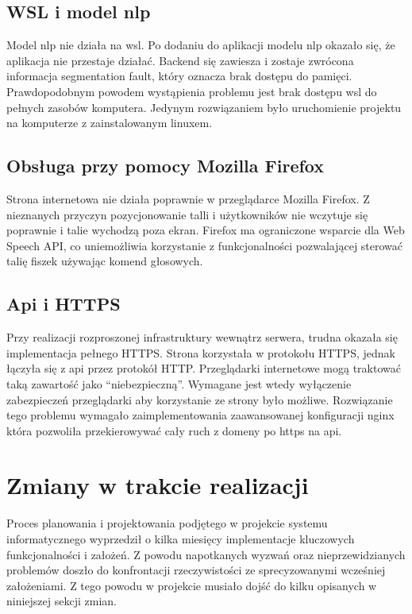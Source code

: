 \subsection{WSL i model nlp}
Model nlp nie działa na wsl. Po dodaniu do aplikacji modelu nlp okazało się, że aplikacja nie przestaje działać. Backend się zawiesza i zostaje zwrócona informacja segmentation fault, który oznacza brak dostępu do pamięci. Prawdopodobnym powodem wystąpienia problemu jest brak dostępu wsl do pełnych zasobów komputera. Jedynym rozwiązaniem było uruchomienie projektu na komputerze z zainstalowanym linuxem.

\subsection{Obsługa przy pomocy Mozilla Firefox}
Strona internetowa nie działa poprawnie w przeglądarce Mozilla Firefox. Z nieznanych przyczyn pozycjonowanie talli i użytkowników nie wczytuje się poprawnie i talie wychodzą poza ekran. Firefox ma ograniczone wsparcie dla Web Speech API,  co uniemożliwia korzystanie z funkcjonalności pozwalającej sterować talię fiszek używając komend głosowych.

\subsection{Api i HTTPS}
Przy realizacji rozproszonej infrastruktury wewnątrz serwera, trudna okazała się implementacja pełnego HTTPS. Strona korzystała w protokołu HTTPS, jednak łączyła się z api przez protokół HTTP. Przeglądarki internetowe mogą traktować taką zawartość jako “niebezpieczną”. Wymagane jest wtedy wyłączenie zabezpieczeń przeglądarki aby korzystanie ze strony było możliwe. Rozwiązanie tego problemu wymagało zaimplementowania zaawansowanej konfiguracji nginx która pozwoliła przekierowywać cały ruch z domeny po https na api.

\section{Zmiany w trakcie realizacji}
Proces planowania i projektowania podjętego w projekcie systemu informatycznego wyprzedził o kilka miesięcy implementacje kluczowych funkcjonalności i założeń. Z powodu napotkanych wyzwań oraz nieprzewidzianych problemów doszło do konfrontacji rzeczywistości ze sprecyzowanymi wcześniej założeniami. Z tego powodu w projekcie musiało dojść do kilku opisanych w niniejszej sekcji zmian.

